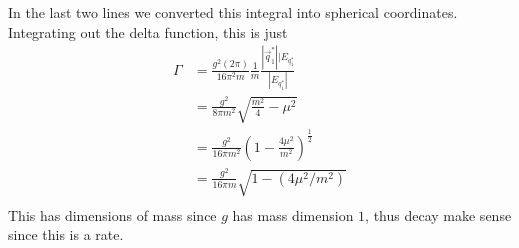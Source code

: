  In the last two lines we converted this integral into spherical 
 coordinates. 
 Integrating out the delta function, this is just 
 \begin{align*} 
	 \Gamma & = \frac{g ^ 2 ( 2 \pi ) }{ 16 \pi ^2 m} \frac{1}{m } \frac{ |\vec{q} _ 1 ^ * | | E_{ q_ 1 ^ * }}{
	 | E_{ q_ 1 ^ * } | } \\ 
	 &=  \frac{ g ^ 2 }{ 8 \pi m ^ 2 } \sqrt{ \frac{m ^ 2 }{ 4 }  - \mu ^ 2 }   \\ 
	 &=  \frac{g ^ 2 }{ 16 \pi m ^ 2 } \left(  1 -\frac{4 \mu ^ 2 }{ m ^ 2 }  \right)^{ \frac{1}{2 } }  \\
	 &=  \frac{g ^ 2 }{ 16 \pi m } \sqrt{ 1 - ( 4 \mu ^ 2 / m ^ 2 ) }  \\
 \end{align*} 
 This has dimensions of mass since $ g  $ has mass dimension $ 1 $, thus 
 decay make sense since this is a rate. 
\pagebreak 

